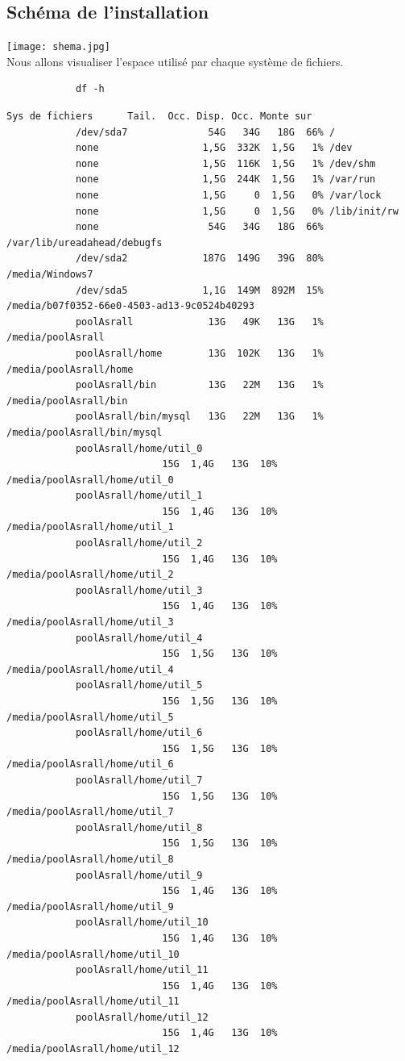 \documentclass[a4paper]{report}
\begin{document}
	\subsection{Schéma de l'installation}
		\texttt{[image: shema.jpg]}\\
	Nous allons visualiser l'espace utilisé par chaque système de fichiers.
		\begin{lstlisting}
			df -h
		\end{lstlisting}
		\begin{lstlisting}[backgroundcolor=\color{yellow}]
			Sys de fichiers      Tail.  Occ. Disp. Occ. Monte sur
			/dev/sda7              54G   34G   18G  66% /
			none                  1,5G  332K  1,5G   1% /dev
			none                  1,5G  116K  1,5G   1% /dev/shm
			none                  1,5G  244K  1,5G   1% /var/run
			none                  1,5G     0  1,5G   0% /var/lock
			none                  1,5G     0  1,5G   0% /lib/init/rw
			none                   54G   34G   18G  66% /var/lib/ureadahead/debugfs
			/dev/sda2             187G  149G   39G  80% /media/Windows7
			/dev/sda5             1,1G  149M  892M  15% /media/b07f0352-66e0-4503-ad13-9c0524b40293
			poolAsrall             13G   49K   13G   1% /media/poolAsrall
			poolAsrall/home        13G  102K   13G   1% /media/poolAsrall/home
			poolAsrall/bin         13G   22M   13G   1% /media/poolAsrall/bin
			poolAsrall/bin/mysql   13G   22M   13G   1% /media/poolAsrall/bin/mysql
			poolAsrall/home/util_0
					       15G  1,4G   13G  10% /media/poolAsrall/home/util_0
			poolAsrall/home/util_1
					       15G  1,4G   13G  10% /media/poolAsrall/home/util_1
			poolAsrall/home/util_2
					       15G  1,4G   13G  10% /media/poolAsrall/home/util_2
			poolAsrall/home/util_3
					       15G  1,4G   13G  10% /media/poolAsrall/home/util_3
			poolAsrall/home/util_4
					       15G  1,5G   13G  10% /media/poolAsrall/home/util_4
			poolAsrall/home/util_5
					       15G  1,5G   13G  10% /media/poolAsrall/home/util_5
			poolAsrall/home/util_6
					       15G  1,5G   13G  10% /media/poolAsrall/home/util_6
			poolAsrall/home/util_7
					       15G  1,5G   13G  10% /media/poolAsrall/home/util_7
			poolAsrall/home/util_8
					       15G  1,5G   13G  10% /media/poolAsrall/home/util_8
			poolAsrall/home/util_9
					       15G  1,4G   13G  10% /media/poolAsrall/home/util_9
			poolAsrall/home/util_10
					       15G  1,4G   13G  10% /media/poolAsrall/home/util_10
			poolAsrall/home/util_11
					       15G  1,4G   13G  10% /media/poolAsrall/home/util_11
			poolAsrall/home/util_12
					       15G  1,4G   13G  10% /media/poolAsrall/home/util_12

\end{lstlisting}
\end{document}
